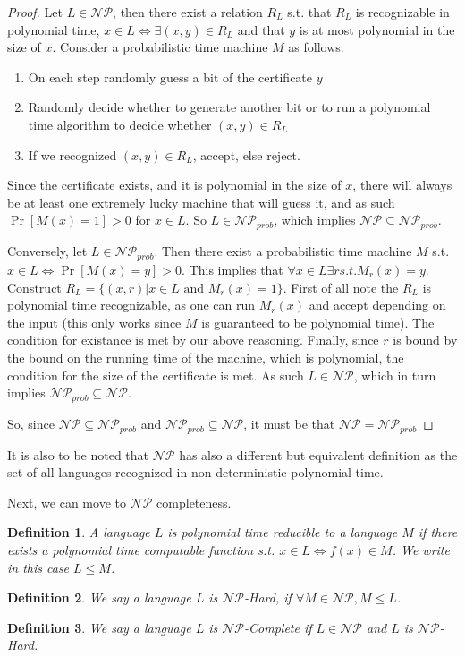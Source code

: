 \documentclass{article}
\newtheorem{definition}{Definition}
\begin{document}
\begin{proof}
Let $L \in \mathcal{NP}$, then there exist a relation $R_L$ s.t. that $R_L$ is recognizable in polynomial time, $x \in L \iff \exists (x, y) \in R_L$ and that $y$ is at most polynomial in the size of $x$. Consider a probabilistic time machine $M$ as follows: 
\begin{enumerate}
    \item On each step randomly guess a bit of the certificate $y$
    \item Randomly decide whether to generate another bit or to run a polynomial time algorithm to decide whether $(x, y) \in R_L$
    \item If we recognized $(x, y) \in R_L$, accept, else reject. 
\end{enumerate}

Since the certificate exists, and it is polynomial in the size of $x$, there will always be at least one extremely lucky machine that will guess it, and as such $\Pr[M(x) = 1] > 0$ for $x \in L$. So $L \in \mathcal{NP}_{prob}$, which implies $\mathcal{NP} \subseteq \mathcal{NP}_{prob}$. 

Conversely, let $L \in \mathcal{NP}_{prob}$. Then there exist a probabilistic time machine $M$ s.t. $x \in L \iff \Pr[M(x) = y] > 0$. This implies that $\forall x \in L\exists r s.t. M_r(x) = y$. Construct $R_L = \{ (x, r) | x \in L \text { and } M_r(x) = 1 \}$. First of all note the $R_L$ is polynomial time recognizable, as one can run $M_r(x)$ and accept depending on the input (this only works since $M$ is guaranteed to be polynomial time). The condition for existance is met by our above reasoning. Finally, since $r$ is bound by the bound on the running time of the machine, which is polynomial, the condition for the size of the certificate is met. As such $L \in \mathcal{NP}$, which in turn implies $\mathcal{NP}_{prob} \subseteq \mathcal{NP}$. \par

So, since $\mathcal{NP} \subseteq \mathcal{NP}_{prob}$ and $\mathcal{NP}_{prob} \subseteq \mathcal{NP}$, it must be that $\mathcal{NP} = \mathcal{NP}_{prob}$


\end{proof}

It is also to be noted that $\mathcal{NP}$ has also a different but equivalent definition as the set of all languages recognized in non deterministic polynomial time. \par

Next, we can move to $\mathcal{NP}$ completeness. 
\begin{definition}
A language $L$ is polynomial time reducible to a language $M$ if there exists a polynomial time computable function s.t. $x \in L \iff f(x) \in M$. We write in this case $L \leq M$.
\end{definition}
\begin{definition}
We say a language $L$ is $\mathcal{NP}$-Hard, if $\forall M \in \mathcal{NP}, M \leq L$.
\end{definition}
\begin{definition}
We say a language $L$ is $\mathcal{NP}$-Complete if $L \in \mathcal{NP}$ and $L$ is $\mathcal{NP}$-Hard.
\end{definition}
\end{document}
